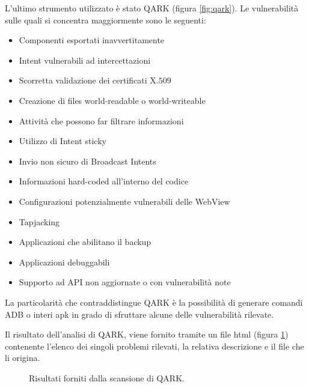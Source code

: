 L'ultimo strumento utilizzato è stato \ac{QARK} \cite{QARK} (figura \ref{fig:qark}). Le vulnerabilità sulle quali si concentra maggiormente sono le seguenti:
\begin{itemize}
	\item Componenti esportati inavvertitamente
	\item Intent vulnerabili ad intercettazioni
	\item Scorretta validazione dei certificati X.$509$
	\item Creazione di files world-readable o world-writeable
	\item Attività che possono far filtrare informazioni
	\item Utilizzo di Intent sticky
	\item Invio non sicuro di Broadcast Intents
	\item Informazioni hard-coded all'interno del codice
	\item Configurazioni potenzialmente vulnerabili delle WebView
	\item Tapjacking
	\item Applicazioni che abilitano il backup
	\item Applicazioni debuggabili
	\item Supporto ad API non aggiornate o con vulnerabilità note
\end{itemize}

La particolarità che contraddistingue QARK è la possibilità di generare comandi \ac{ADB} o interi apk in grado di sfruttare alcune delle vulnerabilità rilevate.

Il risultato dell'analisi di QARK, viene fornito tramite un file html (figura \ref{fig:qarkResults}) contenente l'elenco dei singoli problemi rilevati, la relativa descrizione e il file che li origina.
\begin{figure}[h]
	\centering 
	\caption{Risultati forniti dalla scansione di QARK.}
	\label{fig:qarkResults}
\end{figure}